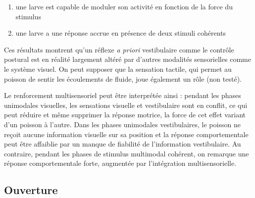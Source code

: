 \begin{enumerate}
    \item une larve est capable de moduler son activité en fonction de la force du stimulus
    \item une larve a une réponse accrue en présence de deux stimuli cohérents
\end{enumerate}

Ces résultats montrent qu'un réflexe \emph{a priori} vestibulaire comme le contrôle postural est en réalité largement altéré par d'autres modalités sensorielles comme le système visuel. On peut supposer que la sensation tactile, qui permet au poisson de sentir les écoulements de fluide, joue également un rôle (non testé). 

Le renforcement multisensoriel peut être interprétée ainsi : pendant les phases unimodales visuelles, les sensations visuelle et vestibulaire sont en conflit, ce qui peut réduire et même supprimer la réponse motrice, la force de cet effet variant d'un poisson à l'autre. Dans les phases unimodales vestibulaires, le poisson ne reçoit aucune information visuelle sur sa position et la réponse comportementale peut être affaiblie par un manque de fiabilité de l'information vestibulaire. Au contraire, pendant les phases de stimulus multimodal cohérent, on remarque une réponse comportementale forte, augmentée par l'intégration multisensorielle.


\subsection{Ouverture}


